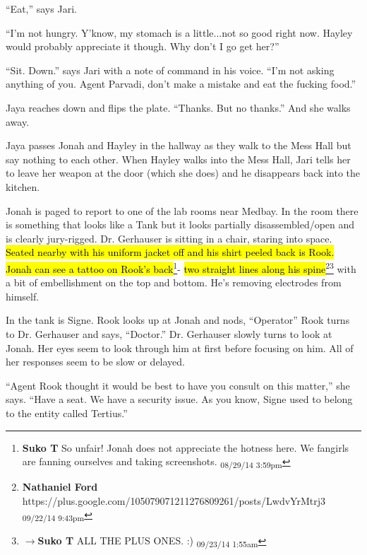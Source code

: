 ``Eat,'' says Jari.

``I'm not hungry.  Y'know, my stomach is a little...not so good right now.  Hayley would probably appreciate it though.  Why don't I go get her?''

``Sit.  Down.'' says Jari with a note of command in his voice.  ``I'm not asking anything of you.  Agent Parvadi, don't make a mistake and eat the fucking food.''

Jaya reaches down and flips the plate.  ``Thanks.  But no thanks.'' And she walks away.



Jaya passes Jonah and Hayley in the hallway as they walk to the Mess Hall but say nothing to each other.  When Hayley walks into the Mess Hall, Jari tells her to leave her weapon at the door (which she does) and he disappears back into the kitchen.





Jonah is paged to report to one of the lab rooms near Medbay.  In the room there is something that looks like a Tank but it looks partially disassembled/open and is clearly jury-rigged.  Dr. Gerhauser is sitting in a chair, staring into space.  \hl{Seated nearby with his uniform jacket off and his shirt peeled back is Rook.  Jonah can see a tattoo on Rook's back}\footnote{\textbf{Suko T }So unfair!  Jonah does not appreciate the hotness here.  We fangirls are fanning ourselves and taking screenshots. \textsubscript{08/29/14 3:59pm}}- \hl{two straight lines along his spine}\footnote{\textbf{Nathaniel Ford }https://plus.google.com/105079071211276809261/posts/LwdvYrMtrj3 \textsubscript{09/22/14 9:43pm}}\footnote{$\rightarrow$\textbf{Suko T }ALL THE PLUS ONES. :) \textsubscript{09/23/14 1:55am}} with a bit of embellishment on the top and bottom.  He's removing electrodes from himself.  



In the tank is Signe.  Rook looks up at Jonah and nods, ``Operator''  Rook turns to Dr. Gerhauser and says, ``Doctor.''  Dr. Gerhauser slowly turns to look at Jonah.  Her eyes seem to look through him at first before focusing on him.  All of her responses seem to be slow or delayed.



``Agent Rook thought it would be best to have you consult on this matter,'' she says.  ``Have a seat.  We have a security issue.  As you know, Signe used to belong to the entity called Tertius.''

